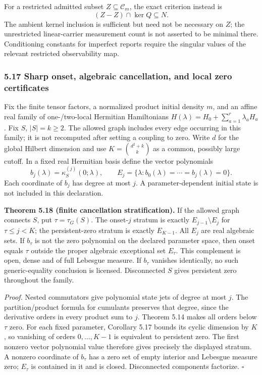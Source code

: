 \documentclass[
  11pt,
]{article}
\begin{document}
For a restricted admitted subset \(Z\subseteq\mathcal C_m\), the exact
criterion instead is
\[
 (Z-Z)\cap\ker Q\subseteq N.
\]
The ambient kernel inclusion is sufficient but need not be necessary on \(Z\);
the unrestricted linear-carrier measurement count is not asserted to be
minimal there. Conditioning constants for imperfect reports require the
singular values of the relevant restricted observability map.

\subsubsection{5.17 Sharp onset, algebraic cancellation, and local zero certificates}\label{sharp-onset-algebraic-cancellation-and-local-zero-certificates}

Fix the finite tensor factors, a normalized product initial density \(m\), and
an affine real family of one-/two-local Hermitian Hamiltonians
\(H(\lambda)=H_0+\sum_{a=1}^r\lambda_a H_a\). Fix \(S\), \(|S|=k\ge2\).
The allowed graph includes every edge occurring in this family; it is not
recomputed after setting a coupling to zero. Write \(d\) for the global Hilbert
dimension and use \(K={d^2+k\choose k}\) as a common, possibly large cutoff.
In a fixed real Hermitian basis define the vector polynomials
\[
 b_j(\lambda)=\kappa_S^{(j)}(0;\lambda),\qquad
 E_j=\{\lambda:b_0(\lambda)=\cdots=b_j(\lambda)=0\}.
\]
Each coordinate of \(b_j\) has degree at most \(j\). A parameter-dependent initial
state is not included in this declaration.

\textbf{Theorem 5.18 (finite cancellation stratification).} If the allowed graph
connects \(S\), put \(\tau=\tau_G(S)\). The onset-\(j\) stratum is exactly
\(E_{j-1}\setminus E_j\) for \(\tau\le j<K\); the persistent-zero stratum is
exactly \(E_{K-1}\). All \(E_j\) are real algebraic sets. If \(b_\tau\) is not the
zero polynomial on the declared parameter space, then onset equals \(\tau\)
outside the proper algebraic exceptional set \(E_\tau\). This complement is
open, dense and of full Lebesgue measure. If \(b_\tau\) vanishes identically,
no such generic-equality conclusion is licensed. Disconnected \(S\) gives
persistent zero throughout the family.

\emph{Proof.} Nested commutators give polynomial state jets of degree at most \(j\).
The partition/product formula for cumulants preserves that degree, since
the derivative orders in every product sum to \(j\). Theorem 5.14 makes all
orders below \(\tau\) zero. For each fixed parameter, Corollary 5.17 bounds
its cyclic dimension by \(K\), so vanishing of orders \(0,\ldots,K-1\) is
equivalent to persistent zero. The first nonzero vector polynomial value
therefore gives precisely the displayed stratum. A nonzero coordinate of
\(b_\tau\) has a zero set of empty interior and Lebesgue measure zero; \(E_\tau\)
is contained in it and is closed. Disconnected components factorize. \(\square\)
\end{document}
